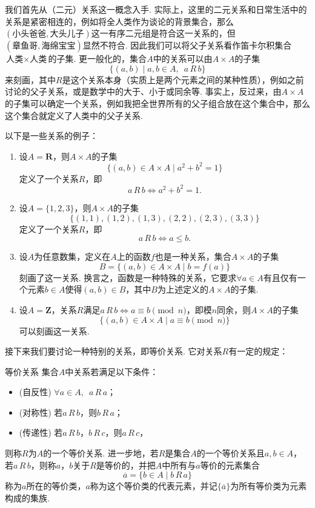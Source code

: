 我们首先从（二元）关系这一概念入手. 实际上，这里的二元关系和日常生活中的关系是紧密相连的，例如将全人类作为谈论的背景集合，那么$(\text{小头爸爸}, \text{大头儿子})$这一有序二元组是符合这一关系的，但$(\text{章鱼哥}, \text{海绵宝宝})$显然不符合. 因此我们可以将父子关系看作笛卡尔积集合$\text{人类}\times\text{人类}$的子集. 更一般化的，集合$A$中的关系可以由$A\times A$的子集
\[\{(a,b) \mid a,b\in A, \enspace a\,R\,b\}\]
来刻画，其中$R$是这个关系本身（实质上是两个元素之间的某种性质），例如之前讨论的父子关系，或是数学中的大于、小于或同余等. 事实上，反过来，由$A\times A$的子集可以确定一个关系，例如我把全世界所有的父子组合放在这个集合中，那么这个集合就定义了人类中的父子关系.
\begin{example}{}{}
    以下是一些关系的例子：
    \begin{enumerate}
        \item 设$A=\mathbf{R}$，则$A\times A$的子集
              \[\{(a,b)\in A\times A \mid a^2+b^2=1\}\]
              定义了一个关系$R$，即
              \[a\,R\,b \iff a^2+b^2=1.\]

        \item 设$A=\{1,2,3\}$，则$A\times A$的子集
              \[\{(1,1),(1,2),(1,3),(2,2),(2,3),(3,3)\}\]
              定义了一个关系$R$，即
              \[a\,R\,b \iff a\leqslant b.\]

        \item 设$A$为任意数集，定义在$A$上的函数$f$也是一种关系，集合$A\times A$的子集
              \[B=\{(a,b)\in A\times A \mid b=f(a)\}\]
              刻画了这一关系. 换言之，函数是一种特殊的关系，它要求$\forall a\in A$有且仅有一个元素$b\in A$使得$(a,b)\in B$，其中$B$为上述定义的$A\times A$的子集.

        \item 设$A=\mathbf{Z}$，关系$R$满足$a\,R\,b\iff a\equiv b \pmod n$，即模$n$同余，则$A\times A$的子集
              \[\{(a,b)\in A\times A \mid a\equiv b \pmod n\}\]
              可以刻画这一关系.
    \end{enumerate}
\end{example}

接下来我们要讨论一种特别的关系，即等价关系. 它对关系$R$有一定的规定：
\begin{definition}{}{等价关系}
    集合$A$中关系若满足以下条件：
    \begin{itemize}
        \item (自反性) $\forall a\in A, \enspace a\,R\,a$；

        \item (对称性) 若$a\,R\,b$，则$b\,R\,a$；

        \item (传递性) 若$a\,R\,b$，$b\,R\,c$，则$a\,R\,c$，
    \end{itemize}
    则称$R$为$A$的一个等价关系. 进一步地，若$R$是集合$A$的一个等价关系且$a,b\in A$，若$a\,R\,b$，则称$a$，$b$关于$R$是等价的，并把$A$中所有与$a$等价的元素集合
    \[\overline{a}=\{b\in A \mid b\,R\,a\}\]
    称为$a$所在的等价类，$a$称为这个等价类的代表元素，并记$\{\overline{a}\}$为所有等价类为元素构成的集族.
\end{definition}

